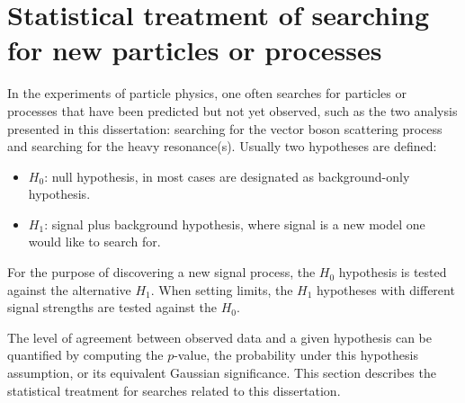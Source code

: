 \chapter{Statistical treatment of searching for new particles or processes}

In the experiments of particle physics, one often searches for particles or processes that have been predicted but not yet observed, such as the two analysis presented in this dissertation: searching for the vector boson scattering process and searching for the heavy resonance(s).
Usually two hypotheses are defined:
\begin{itemize}
    \item $H_{0}$: null hypothesis, in most cases are designated as background-only hypothesis.
    \item $H_{1}$: signal plus background hypothesis, where signal is a new model one would like to search for.
\end{itemize}
For the purpose of discovering a new signal process, the $H_{0}$ hypothesis is tested against the alternative $H_{1}$.
When setting limits, the $H_{1}$ hypotheses with different signal strengths are tested against the $H_{0}$.

The level of agreement between observed data and a given hypothesis can be quantified by computing the $p$-value, the probability under this hypothesis assumption, or its equivalent Gaussian significance.
This section describes the statistical treatment for searches related to this dissertation.




